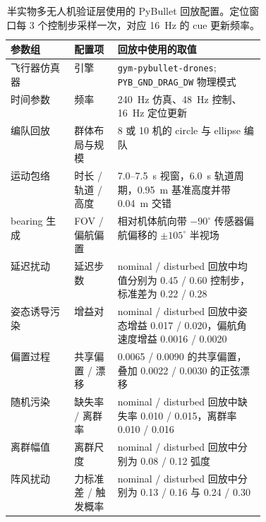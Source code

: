 \begin{table}[!htbp]
\centering
\caption{半实物多无人机验证层使用的 PyBullet 回放配置。定位窗口每 3 个控制步采样一次，对应 16~Hz 的 cue 更新频率。}
\label{tab:pybulletparams}
\small
\setlength{\tabcolsep}{4pt}
\begin{tabularx}{\linewidth}{>{\RaggedRight\arraybackslash}p{0.25\linewidth} >{\RaggedRight\arraybackslash}p{0.17\linewidth} X}
\toprule
参数组 & 配置项 & 回放中使用的取值 \\
\midrule
飞行器仿真器 & 引擎 & \texttt{gym-pybullet-drones}; \texttt{PYB\_GND\_DRAG\_DW} 物理模式 \\
时间参数 & 频率 & 240~Hz 仿真、48~Hz 控制、16~Hz 定位更新 \\
编队回放 & 群体布局与规模 & 8 或 10 机的 circle 与 ellipse 编队 \\
运动包络 & 时长 / 轨道 / 高度 & 7.0--7.5~s 视窗，6.0~s 轨道周期，0.95~m 基准高度并带 0.04~m 交错 \\
bearing 生成 & FOV / 偏航偏置 & 相对机体航向带 $-90^\circ$ 传感器偏航偏移的 $\pm 105^\circ$ 半视场 \\
延迟扰动 & 延迟步数 & nominal / disturbed 回放中均值分别为 0.45 / 0.60 控制步，标准差为 0.22 / 0.28 \\
姿态诱导污染 & 增益对 & nominal / disturbed 回放中姿态增益 0.017 / 0.020，偏航角速度增益 0.0016 / 0.0020 \\
偏置过程 & 共享偏置 / 漂移 & 0.0065 / 0.0090 的共享偏置，叠加 0.0022 / 0.0030 的正弦漂移 \\
随机污染 & 缺失率 / 离群率 & nominal / disturbed 回放中缺失率 0.010 / 0.015，离群率 0.010 / 0.016 \\
离群幅值 & 离群尺度 & nominal / disturbed 回放中分别为 0.08 / 0.12 弧度 \\
阵风扰动 & 力标准差 / 触发概率 & nominal / disturbed 回放中分别为 0.13 / 0.16 与 0.24 / 0.30 \\
\bottomrule
\end{tabularx}
\end{table}
